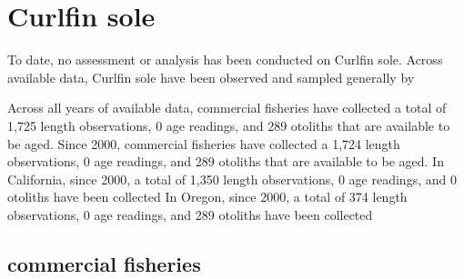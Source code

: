 \documentclass[11pt,
  english,
  letterpaper,
]{article}
\begin{document}

\hypertarget{curlfin-sole}{%
\section{Curlfin sole}\label{curlfin-sole}}

\leavevmode\tagmcend\tagstructend


To date, no assessment or analysis has been conducted on Curlfin sole. Across available data, Curlfin sole have been observed and sampled generally by

\leavevmode\tagmcend\tagstructend\par


Across all years of available data, commercial fisheries have collected a total of 1,725 length observations, 0 age readings, and 289 otoliths that are available to be aged. Since 2000, commercial fisheries have collected a 1,724 length observations, 0 age readings, and 289 otoliths that are available to be aged. In California, since 2000, a total of 1,350 length observations, 0 age readings, and 0 otoliths have been collected In Oregon, since 2000, a total of 374 length observations, 0 age readings, and 289 otoliths have been collected

\leavevmode\tagmcend\tagstructend\par


\hypertarget{commercial-fisheries-16}{%
\subsection{commercial fisheries}\label{commercial-fisheries-16}}

\leavevmode\tagmcend\tagstructend


\begingroup\fontsize{10}{12}\selectfont \begingroup\fontsize{10}{12}\selectfont

\leavevmode\tagmcend\tagstructend\par
\end{document}
